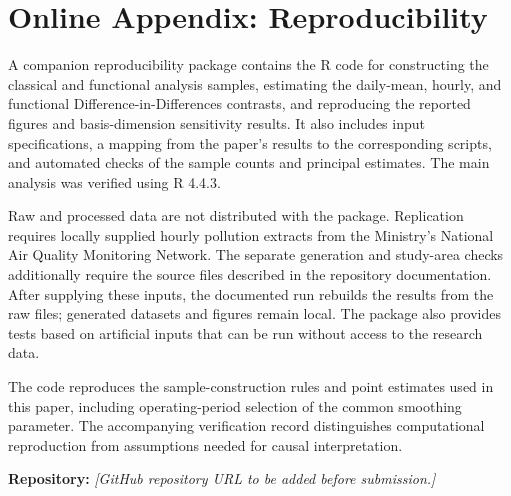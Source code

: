 \chapter*{Online Appendix: Reproducibility}
{}
\label{sec:online-appendix}

A companion reproducibility package contains the R code for constructing the
classical and functional analysis samples, estimating the daily-mean, hourly,
and functional Difference-in-Differences contrasts, and reproducing the
reported figures and basis-dimension sensitivity results. It also includes
input specifications, a mapping from the paper's results to the corresponding
scripts, and automated checks of the sample counts and principal estimates.
The main analysis was verified using R 4.4.3.

Raw and processed data are not distributed with the package. Replication
requires locally supplied hourly pollution extracts from the Ministry's
National Air Quality Monitoring Network. The separate generation and
study-area checks additionally require the source files described in the
repository documentation. After supplying these inputs, the documented run
rebuilds the results from the raw files; generated datasets and figures remain
local. The package also provides tests based on artificial inputs that can be
run without access to the research data.

The code reproduces the sample-construction rules and point estimates used in
this paper, including operating-period selection of the common smoothing
parameter. The accompanying verification record distinguishes computational
reproduction from assumptions needed for causal interpretation.

\medskip
\noindent\textbf{Repository:} \textit{[GitHub repository URL to be added before submission.]}

